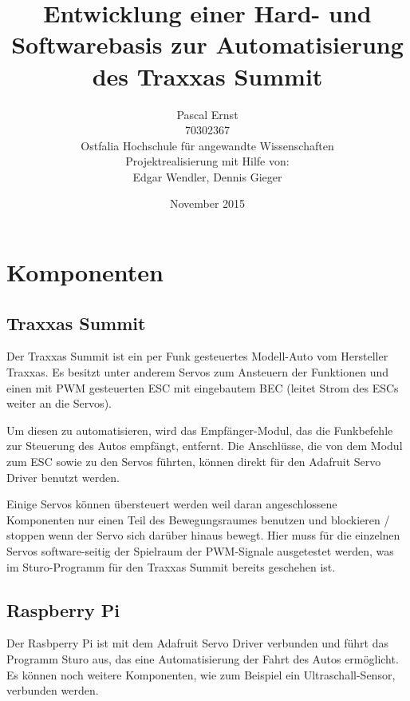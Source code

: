 \documentclass[a4paper,10pt]{scrartcl}
\begin{document}
\title{Entwicklung einer Hard- und Softwarebasis zur Automatisierung des Traxxas Summit}
\author{Pascal Ernst\\
  70302367 \\
  Ostfalia Hochschule für angewandte Wissenschaften \\
  Projektrealisierung mit Hilfe von: \\
  Edgar Wendler, Dennis Gieger}
\date{November 2015}
\maketitle

\newpage

\section{Komponenten}

  \subsection{Traxxas Summit}

    Der Traxxas Summit ist ein per Funk gesteuertes Modell-Auto vom Hersteller
    Traxxas.
    Es besitzt unter anderem Servos zum Ansteuern der Funktionen und einen mit
    PWM gesteuerten ESC mit eingebautem BEC (leitet Strom des ESCs weiter an die
    Servos).

    Um diesen zu automatisieren, wird das Empfänger-Modul, das die Funkbefehle
    zur Steuerung des Autos empfängt, entfernt.
    Die Anschlüsse, die von dem Modul zum ESC sowie zu den Servos führten,
    können direkt für den Adafruit Servo Driver benutzt werden.

    Einige Servos können übersteuert werden weil daran angeschlossene
    Komponenten nur einen Teil des Bewegungsraumes benutzen und blockieren /
    stoppen wenn der Servo sich darüber hinaus bewegt.
    Hier muss für die einzelnen Servos software-seitig der Spielraum der
    PWM-Signale ausgetestet werden, was im Sturo-Programm für den Traxxas Summit
    bereits geschehen ist.

  \subsection{Raspberry Pi}

    Der Rasbperry Pi ist mit dem Adafruit Servo Driver verbunden und führt das
    Programm Sturo aus, das eine Automatisierung der Fahrt des Autos ermöglicht.
    Es können noch weitere Komponenten, wie zum Beispiel ein Ultraschall-Sensor,
    verbunden werden.
\end{document}
